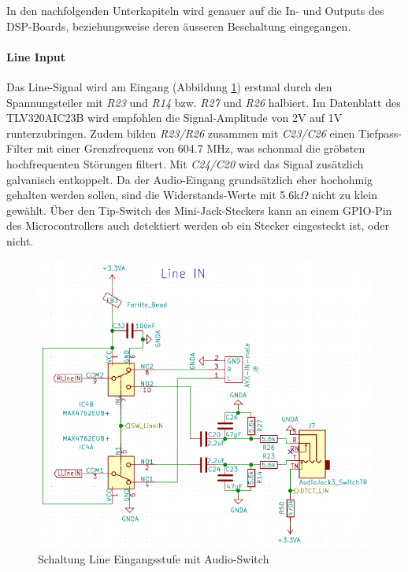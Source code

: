 In den nachfolgenden Unterkapiteln wird genauer auf die In- und Outputs des DSP-Boards, beziehungsweise deren äusseren Beschaltung eingegangen.


\paragraph{Line Input}
\label{par:LineIN}
Das Line-Signal wird am Eingang (Abbildung \ref{fig:Schema_LineIN}) erstmal durch den Spannungsteiler mit \textit{R23} und \textit{R14} bzw. \textit{R27} und \textit{R26} halbiert. Im Datenblatt des TLV320AIC23B \cite{tlv320} wird empfohlen die Signal-Amplitude von 2V auf 1V runterzubringen. Zudem bilden \textit{R23/R26} zusammen mit \textit{C23/C26}  einen Tiefpass-Filter mit einer Grenzfrequenz von 604.7 MHz, was schonmal die gröbsten hochfrequenten Störungen filtert. Mit \textit{C24/C20} wird das Signal zusätzlich galvanisch entkoppelt. Da der Audio-Eingang grundsätzlich eher hochohmig gehalten werden sollen, sind die Widerstands-Werte mit 5.6k$\Omega$ nicht zu klein gewählt. \cite{book:douglas}
Über den Tip-Switch des Mini-Jack-Steckers kann an einem GPIO-Pin des Microcontrollers auch detektiert werden ob ein Stecker eingesteckt ist, oder nicht.

\begin{figure} [H]
\begin{center}
 \includegraphics[scale=0.5]{../graphics/Schema_LineIN.png}
\caption{Schaltung Line Eingangsstufe mit Audio-Switch}
\label{fig:Schema_LineIN}
\end{center}
\end{figure}

